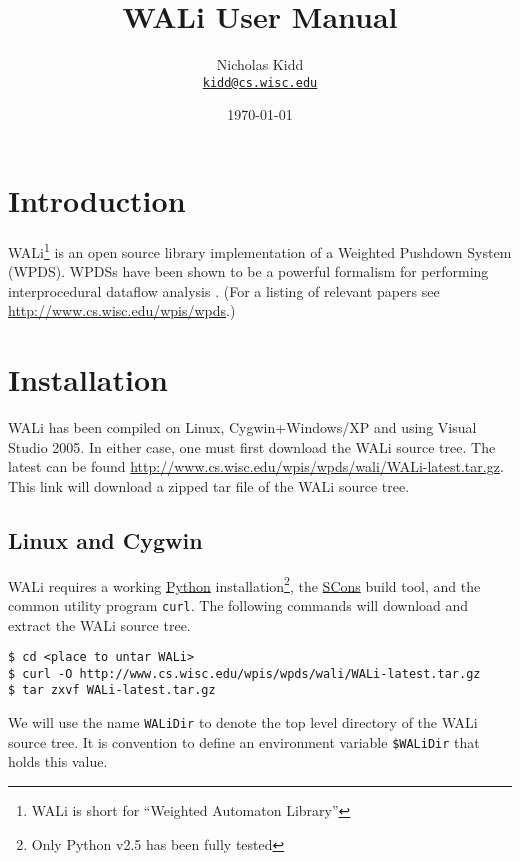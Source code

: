 \documentclass[english,a4paper,11pt]{article}
\title{WALi User Manual}
\date{\today}
\author{ Nicholas Kidd \\ { \href{mailto:kidd@cs.wisc.edu}{\nolinkurl{kidd@cs.wisc.edu}}} }
\theoremstyle{definition}
\begin{document}
\maketitle

\section{Introduction}
\label{Se:Introduction}
WALi\footnote{WALi is short for ``Weighted Automaton Library''} is an open
source library implementation of a Weighted Pushdown System (WPDS). WPDSs have
been shown to be a powerful formalism for performing interprocedural dataflow
analysis \cite{SAS:RSJ:2003,SCP:RSJM:2005,FSTTCS:RLK:2007}. (For a listing of
relevant papers see \url{http://www.cs.wisc.edu/wpis/wpds}.)

\section{Installation}
\label{Se:Installation}
WALi has been compiled on Linux, Cygwin+Windows/XP and using
Visual Studio 2005. In either case, one must first download the WALi source
tree. The latest can be found
\href{http://www.cs.wisc.edu/wpis/wpds/wali/WALi-latest.tar.gz}{http://www.cs.wisc.edu/wpis/wpds/wali/WALi-latest.tar.gz}.
This link will download a zipped tar file of the WALi source tree.

\subsection{Linux and Cygwin}
\label{Se:Linux}
WALi requires a working \href{http://www.python.org}{Python}
installation\footnote{Only Python v2.5 has been fully tested},
the \href{http://www.scons.org}{SCons} build tool, and the common utility
program \verb!curl!. The following commands will download and extract the WALi
source tree.

\noindent
\begin{cmdbox}
\begin{verbatim}
$ cd <place to untar WALi>
$ curl -O http://www.cs.wisc.edu/wpis/wpds/wali/WALi-latest.tar.gz 
$ tar zxvf WALi-latest.tar.gz
\end{verbatim}
\end{cmdbox}

\noindent  We will use the name \verb!WALiDir! to denote the top level directory of the
WALi source tree. It is convention to define an environment variable
\verb!$WALiDir! that holds this value.
\end{document}
